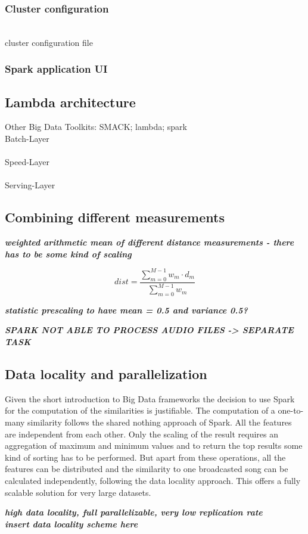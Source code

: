 \subsubsection{Cluster configuration}
\ \\
cluster configuration file\\

\subsubsection{Spark application UI}

\subsection{Lambda architecture}

Other Big Data Toolkits: SMACK; lambda; spark\\

Batch-Layer\\
\ \\
Speed-Layer\\
\ \\
Serving-Layer\\

\subsection{Combining different measurements}

\noindent\textit{\textbf{weighted arithmetic mean of different distance measurements - there has to be some kind of scaling\\}}

\begin{equation} \label{eq:distance}
dist = \frac{\sum_{m = 0}^{M - 1}{w_m \cdot d_m}}{\sum_{m = 0}^{M - 1}{w_m}}
\end{equation}

\noindent\textit{\textbf{statistic prescaling to have mean = 0.5 and variance 0.5?\\}}

\textit{\textbf{SPARK NOT ABLE TO PROCESS AUDIO FILES -> SEPARATE TASK}}

\subsection{Data locality and parallelization}

Given the short introduction to Big Data frameworks the decision to use Spark for the computation of the similarities is justifiable. The computation of a one-to-many similarity follows the shared nothing approach of Spark. All the features are independent from each other. Only the scaling of the result requires an aggregation of maximum and minimum values and to return the top results some kind of sorting has to be performed. But apart from these operations, all the features can be distributed and the similarity to one broadcasted song can be calculated independently, following the data locality approach. This offers a fully scalable solution for very large datasets.

\noindent\textit{\textbf{high data locality, full parallelizable, very low replication rate\\}}
\noindent\textit{\textbf{insert data locality scheme here\\}}
